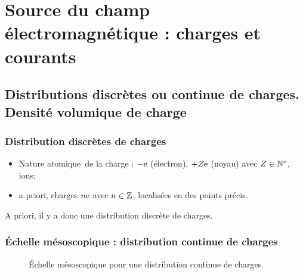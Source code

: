 \section[Charges et courants]{Source du champ électromagnétique : charges et courants}

    \subsection{Distributions discrètes ou continue de charges. Densité volumique de charge}

        \subsubsection{Distribution discrètes de charges}

            \begin{itemize}[label=$\longrightarrow$]
                \item Nature \og atomique\fg~de la charge : $-\mathrm{e}$ (électron), $+Z\mathrm{e}$ (noyau) avec $Z\in\mathbb{N}^{*}$, ions;
                \item a priori, charges $n\mathrm{e}$ avec $n\in\mathbb{Z}$, localisées en des points précis. 
            \end{itemize}

            A priori, il y a donc une distribution discrète de charges.

        \subsubsection{Échelle mésoscopique : distribution continue de charges}

            \begin{figure}
                \centering
                \caption{Échelle mésoscopique pour une distribution continue de charges.}    
                \label{fig:echelle_meso_distribution_continue_charge}
            \end{figure}

